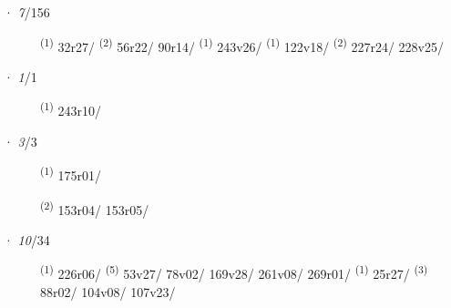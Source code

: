 \ENTRYEND
\noindent{} · \textit{7}/156 \LEMMALINE
\begin{description}
    \item[]  \textsuperscript{(1)} \mbox{32r27/} \textsuperscript{(2)} \mbox{56r22/} \mbox{90r14/} \textsuperscript{(1)} \mbox{243v26/} \CASEBREAK {} \textsuperscript{(1)} \mbox{122v18/} \textsuperscript{(2)} \mbox{227r24/} \mbox{228v25/}
\end{description}
\ENTRYEND
\noindent{} · \textit{1}/1 \LEMMALINE
\begin{description}
    \item[]  \textsuperscript{(1)} \mbox{243r10/}
\end{description}
\ENTRYEND
\noindent{} · \textit{3}/3 \LEMMALINE
\begin{description}
    \item[]  \textsuperscript{(1)} \mbox{175r01/}
    \item[]  \textsuperscript{(2)} \mbox{153r04/} \mbox{153r05/}
\end{description}
\ENTRYEND
\noindent{} · \textit{10}/34 \LEMMALINE
\begin{description}
    \item[]  \textsuperscript{(1)} \mbox{226r06/} \CASEBREAK {} \textsuperscript{(5)} \mbox{53v27/} \mbox{78v02/} \mbox{169v28/} \mbox{261v08/} \mbox{269r01/} \CASEBREAK {} \textsuperscript{(1)} \mbox{25r27/} \CASEBREAK {} \textsuperscript{(3)} \mbox{88r02/} \mbox{104v08/} \mbox{107v23/}
\end{description}
